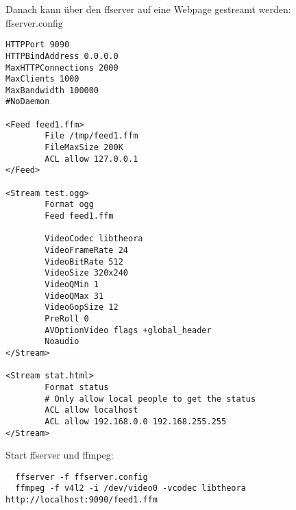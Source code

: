 Danach kann über den ffserver auf eine Webpage gestreamt werden:\\
ffserver.config
\begin{verbatim}
HTTPPort 9090
HTTPBindAddress 0.0.0.0
MaxHTTPConnections 2000
MaxClients 1000
MaxBandwidth 100000
#NoDaemon

<Feed feed1.ffm>
        File /tmp/feed1.ffm
        FileMaxSize 200K
        ACL allow 127.0.0.1
</Feed>

<Stream test.ogg>
        Format ogg
        Feed feed1.ffm

        VideoCodec libtheora
        VideoFrameRate 24
        VideoBitRate 512
        VideoSize 320x240
        VideoQMin 1
        VideoQMax 31
        VideoGopSize 12
        PreRoll 0
        AVOptionVideo flags +global_header
        Noaudio
</Stream>

<Stream stat.html>
        Format status
        # Only allow local people to get the status
        ACL allow localhost
        ACL allow 192.168.0.0 192.168.255.255
</Stream>                         
\end{verbatim}

Start ffserver und ffmpeg:
\begin{verbatim}
  ffserver -f ffserver.config
  ffmpeg -f v4l2 -i /dev/video0 -vcodec libtheora http://localhost:9090/feed1.ffm
\end{verbatim}



